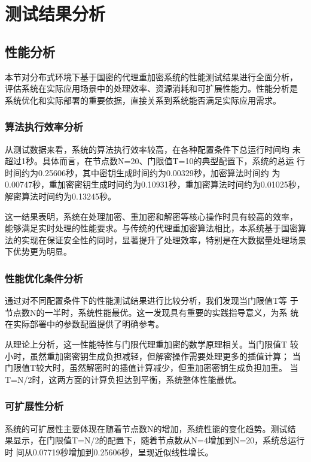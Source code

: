 \section{测试结果分析}

\subsection{性能分析}

本节对分布式环境下基于国密的代理重加密系统的性能测试结果进行全面分析，
评估系统在实际应用场景中的处理效率、资源消耗和可扩展性能力。性能分析是
系统优化和实际部署的重要依据，直接关系到系统能否满足实际应用需求。

\subsubsection{算法执行效率分析}

从测试数据来看，系统的算法执行效率较高，在各种配置条件下总运行时间均
未超过1秒。具体而言，在节点数N=20、门限值T=10的典型配置下，系统的总运
行时间约为0.25606秒，其中密钥生成时间约为0.00329秒，加密算法时间约
为0.00747秒，重加密密钥生成时间约为0.10931秒，重加密算法时间约为0.01025秒，
解密算法时间约为0.13245秒。

这一结果表明，系统在处理加密、重加密和解密等核心操作时具有较高的效率，
能够满足实时处理的性能要求。与传统的代理重加密算法相比，本系统基于国密算
法的实现在保证安全性的同时，显著提升了处理效率，特别是在大数据量处理场景
下优势更为明显。

\subsubsection{性能优化条件分析}

通过对不同配置条件下的性能测试结果进行比较分析，我们发现当门限值T等
于节点数N的一半时，系统性能最优。这一发现具有重要的实践指导意义，为系
统在实际部署中的参数配置提供了明确参考。

从理论上分析，这一性能特性与门限代理重加密的数学原理相关。当门限值T
较小时，虽然重加密密钥生成负担减轻，但解密操作需要处理更多的插值计算；
当门限值T较大时，虽然解密时的插值计算减少，但重加密密钥生成负担加重。
当T=N/2时，这两方面的计算负担达到平衡，系统整体性能最优。

\subsubsection{可扩展性分析}

系统的可扩展性主要体现在随着节点数N的增加，系统性能的变化趋势。测试结
果显示，在门限值T=N/2的配置下，随着节点数从N=4增加到N=20，系统总运行时
间从0.07719秒增加到0.25606秒，呈现近似线性增长。

